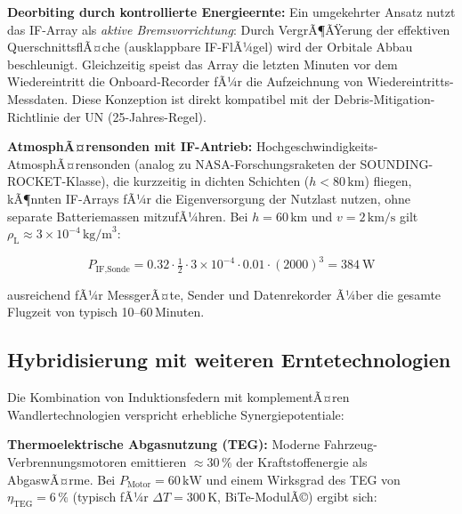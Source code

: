 ﻿\documentclass[12pt, a4paper]{report}
\theoremstyle{definition}
\theoremstyle{remark}
\newcommand{\rhoL}{\rho_{\text{L}}}
\begin{document}
\textbf{Deorbiting durch kontrollierte Energieernte:}
Ein umgekehrter Ansatz nutzt das IF-Array als \emph{aktive Bremsvorrichtung}:
Durch VergrÃ¶ÃŸerung der effektiven QuerschnittsflÃ¤che (ausklappbare IF-FlÃ¼gel)
wird der Orbitale Abbau beschleunigt. Gleichzeitig speist das Array die
letzten Minuten vor dem Wiedereintritt die Onboard-Recorder fÃ¼r die
Aufzeichnung von Wiedereintritts-Messdaten. Diese Konzeption ist direkt
kompatibel mit der Debris-Mitigation-Richtlinie der UN (25-Jahres-Regel).

\textbf{AtmosphÃ¤rensonden mit IF-Antrieb:}
Hochgeschwindigkeits-AtmosphÃ¤ren\-sonden (analog zu NASA-Forschungsraketen
der SOUNDING-ROCKET-Klasse), die kurzzeitig in dichten Schichten ($h < 80\,\text{km}$)
fliegen, kÃ¶nnten IF-Arrays fÃ¼r die Eigenversorgung der Nutzlast nutzen,
ohne separate Batteriemassen mitzufÃ¼hren. Bei $h = 60\,\text{km}$ und
$v = 2\,\text{km/s}$ gilt $\rhoL \approx 3 \times 10^{-4}\,\text{kg/m}^3$:

\begin{equation}
  P_{\text{IF,Sonde}} = 0.32 \cdot \tfrac{1}{2} \cdot 3 \times 10^{-4} \cdot 0.01 \cdot (2000)^3
  = \SI{384}{\watt}
  \label{eq:p_sonde}
\end{equation}

ausreichend fÃ¼r MessgerÃ¤te, Sender und Datenrekorder Ã¼ber die gesamte
Flugzeit von typisch 10--60\,Minuten.

\subsection{Hybridisierung mit weiteren Erntetechnologien}
\label{ssec:ausblick_hybrid}

Die Kombination von Induktionsfedern mit komplementÃ¤ren Wandlertechnologien
verspricht erhebliche Synergiepotentiale:

\textbf{Thermoelektrische Abgasnutzung (TEG):}
Moderne Fahrzeug-Verbrennungsmoto\-ren emittieren $\approx 30\,\%$ der
Kraftstoffenergie als AbgaswÃ¤rme. Bei $P_{\text{Motor}} = 60\,\text{kW}$
und einem Wirk\-sgrad des TEG von $\eta_{\text{TEG}} = 6\,\%$ (typisch fÃ¼r
$\Delta T = 300\,\text{K}$, BiTe-ModulÃ©) ergibt sich:
\end{document}

